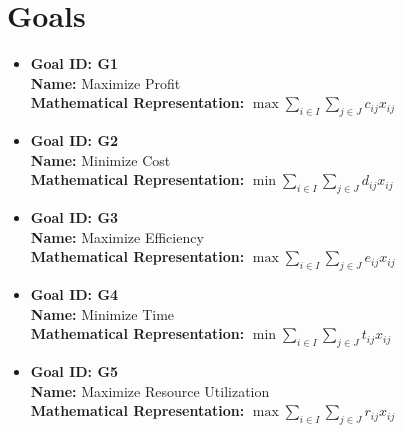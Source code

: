 \documentclass{article}
\begin{document}
\section{Goals}
\begin{itemize}
    \item \textbf{Goal ID: G1} \\
    \textbf{Name:} Maximize Profit \\
    \textbf{Mathematical Representation:} $\max \sum_{i \in I} \sum_{j \in J} c_{ij}x_{ij}$

    \item \textbf{Goal ID: G2} \\
    \textbf{Name:} Minimize Cost \\
    \textbf{Mathematical Representation:} $\min \sum_{i \in I} \sum_{j \in J} d_{ij}x_{ij}$

    \item \textbf{Goal ID: G3} \\
    \textbf{Name:} Maximize Efficiency \\
    \textbf{Mathematical Representation:} $\max \sum_{i \in I} \sum_{j \in J} e_{ij}x_{ij}$

    \item \textbf{Goal ID: G4} \\
    \textbf{Name:} Minimize Time \\
    \textbf{Mathematical Representation:} $\min \sum_{i \in I} \sum_{j \in J} t_{ij}x_{ij}$

    \item \textbf{Goal ID: G5} \\
    \textbf{Name:} Maximize Resource Utilization \\
    \textbf{Mathematical Representation:} $\max \sum_{i \in I} \sum_{j \in J} r_{ij}x_{ij}$
\end{itemize}
\end{document}
